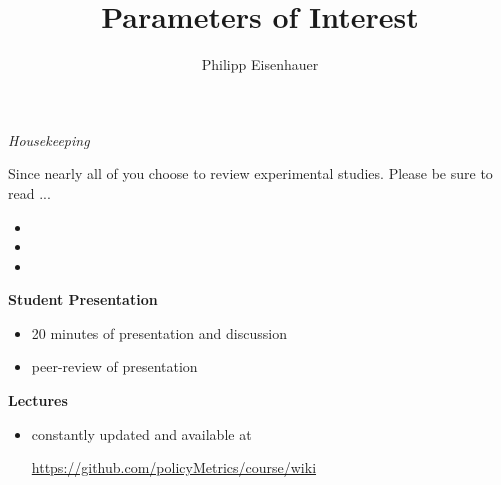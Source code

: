 

\title{Parameters of Interest}
\author{Philipp Eisenhauer}

\date{}

\let\otp\titlepage


\maketitle

\begin{frame}\begin{center}
\LARGE\textit{Housekeeping}
\end{center}\end{frame}
\begin{frame}
Since nearly all of you choose to review experimental studies. Please be sure to read ...

\begin{itemize}
\item {}
\item {}
\item {}
\end{itemize}
\end{frame}

\begin{frame}
\textbf{Student Presentation}
\begin{itemize}
\item 20 minutes of presentation and discussion
\item peer-review of presentation\vspace{0.5cm}
\end{itemize}

\textbf{Lectures}
\begin{itemize}
\item constantly updated and available at\vspace{0.2cm}
\begin{center}\url{https://github.com/policyMetrics/course/wiki}\end{center}
\end{itemize}
\end{frame}

